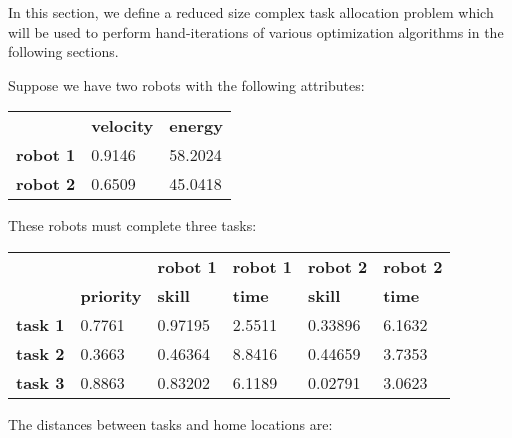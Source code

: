 \documentclass[a4paper]{article}
\begin{document}


In this section, we define a reduced size complex task allocation problem which
will be used to perform hand-iterations of various optimization algorithms in
the following sections.

Suppose we have two robots with the following attributes:

\begin{center}
\begin{tabular}{lll}
        & \textbf{velocity} & \textbf{energy} \\
\textbf{robot 1} & 0.9146   & 58.2024          \\
\textbf{robot 2} & 0.6509   & 45.0418
\end{tabular}
\end{center}
\vspace{1em}

These robots must complete three tasks:

\begin{center}
\begin{tabular}{llllll}
                &                   & \textbf{robot 1} & \textbf{robot 1} & \textbf{robot 2} & \textbf{robot 2} \\
                & \textbf{priority} & \textbf{skill}   & \textbf{time}    & \textbf{skill}   & \textbf{time} \\
\textbf{task 1} & 0.7761            & 0.97195          & 2.5511           & 0.33896          & 6.1632        \\
\textbf{task 2} & 0.3663            & 0.46364          & 8.8416           & 0.44659          & 3.7353        \\
\textbf{task 3} & 0.8863            & 0.83202          & 6.1189           & 0.02791          & 3.0623
\end{tabular}
\end{center}
\vspace{1em}

The distances between tasks and home locations are:
\end{document}
